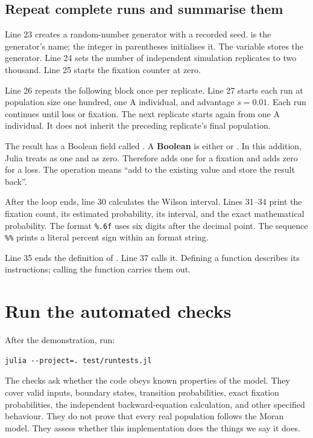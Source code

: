 \subsection{Repeat complete runs and summarise them}



Line 23 creates a random-number generator with a recorded seed.
 is the generator's name; the integer in parentheses
initialises it. The variable  stores the generator. Line 24
sets the number of independent simulation replicates to two thousand.
Line 25 starts the fixation counter at zero.

Line 26 repeats the following block once per replicate. Line 27 starts each
run at population size one hundred, one A individual, and advantage
\(s=0.01\). Each run continues until loss or fixation. The next replicate
starts again from one A individual. It does not inherit the preceding
replicate's final population.

The result has a Boolean field called . A \textbf{Boolean}
is either  or . In this addition, Julia treats
 as one and  as zero. Therefore
 adds one for a fixation and adds zero
for a loss. The operation \code{+=} means ``add to the existing value and
store the result back''.

After the loop ends, line 30 calculates the Wilson interval. Lines 31--34
print the fixation count, its estimated probability, its interval, and the
exact mathematical probability. The format \verb|%.6f| uses six digits
after the decimal point. The sequence \verb|%%| prints a literal percent
sign within an  format string.

Line 35 ends the definition of . Line 37 calls it. Defining a
function describes its instructions; calling the function carries them out.

\section{Run the automated checks}

After the demonstration, run:
\begin{lstlisting}[language={},numbers=none]
julia --project=. test/runtests.jl
\end{lstlisting}
The checks ask whether the code obeys known properties of the model. They
cover valid inputs, boundary states, transition probabilities, exact fixation
probabilities, the independent backward-equation calculation, and other
specified behaviour. They do not prove that every real population follows
the Moran model. They assess whether this implementation does the things
we say it does.

